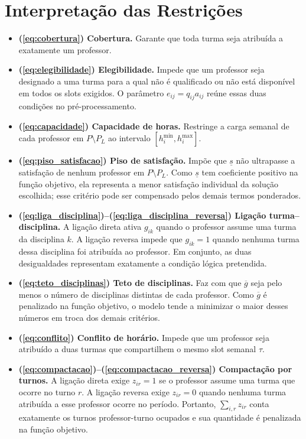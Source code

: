 \documentclass[11pt,a4paper]{article}
\begin{document}
\section{Interpretação das Restrições}
\begin{itemize}
  \item \textbf{(\ref{eq:cobertura}) Cobertura.} Garante que toda turma seja atribuída a exatamente um professor.
  \item \textbf{(\ref{eq:elegibilidade}) Elegibilidade.} Impede que um professor seja designado a uma turma para a qual não é qualificado ou não está disponível em todos os slots exigidos. O parâmetro $e_{ij}=q_{ij}a_{ij}$ reúne essas duas condições no pré-processamento.
  \item \textbf{(\ref{eq:capacidade}) Capacidade de horas.} Restringe a carga semanal de cada professor em $P\setminus P_L$ ao intervalo $[h_i^{\min},h_i^{\max}]$.
  \item \textbf{(\ref{eq:piso_satisfacao}) Piso de satisfação.} Impõe que $\underline{s}$ não ultrapasse a satisfação de nenhum professor em $P\setminus P_L$. Como $\underline{s}$ tem coeficiente positivo na função objetivo, ela representa a menor satisfação individual da solução escolhida; esse critério pode ser compensado pelos demais termos ponderados.
  \item \textbf{(\ref{eq:liga_disciplina})--(\ref{eq:liga_disciplina_reversa}) Ligação turma--disciplina.} A ligação direta ativa $g_{ik}$ quando o professor assume uma turma da disciplina $k$. A ligação reversa impede que $g_{ik}=1$ quando nenhuma turma dessa disciplina foi atribuída ao professor. Em conjunto, as duas desigualdades representam exatamente a condição lógica pretendida.
  \item \textbf{(\ref{eq:teto_disciplinas}) Teto de disciplinas.} Faz com que $\overline{g}$ seja pelo menos o número de disciplinas distintas de cada professor. Como $\overline{g}$ é penalizado na função objetivo, o modelo tende a minimizar o maior desses números em troca dos demais critérios.
  \item \textbf{(\ref{eq:conflito}) Conflito de horário.} Impede que um professor seja atribuído a duas turmas que compartilhem o mesmo slot semanal $\tau$.
  \item \textbf{(\ref{eq:compactacao})--(\ref{eq:compactacao_reversa}) Compactação por turnos.} A ligação direta exige $z_{ir}=1$ se o professor assume uma turma que ocorre no turno $r$. A ligação reversa exige $z_{ir}=0$ quando nenhuma turma atribuída a esse professor ocorre no período. Portanto, $\sum_{i,r}z_{ir}$ conta exatamente os turnos professor-turno ocupados e sua quantidade é penalizada na função objetivo.
\end{itemize}
\end{document}
